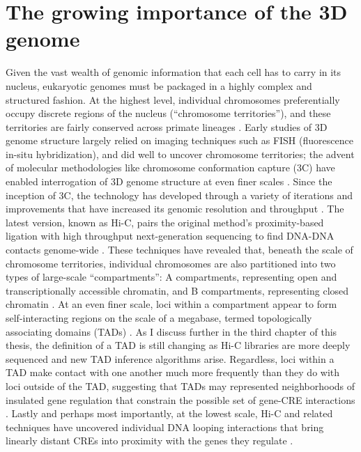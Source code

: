 \section{The growing importance of the 3D genome}
Given the vast wealth of genomic information that each cell has to carry in its nucleus, eukaryotic genomes must be packaged in a highly complex and structured fashion. At the highest level, individual chromosomes preferentially occupy discrete regions of the nucleus (``chromosome territories''), and these territories are fairly conserved across primate lineages \cite{Meaburn.2007, Mora.2006, Tanabe.2002}. Early studies of 3D genome structure largely relied on imaging techniques such as FISH (fluorescence in-situ hybridization), and did well to uncover chromosome territories; the advent of molecular methodologies like chromosome conformation capture (3C) have enabled interrogation of 3D genome structure at even finer scales \cite{Dekker.2002}. Since the inception of 3C, the technology has developed through a variety of iterations and improvements that have increased its genomic resolution and throughput \cite{Fraser.2015}. The latest version, known as Hi-C, pairs the original method's proximity-based ligation with high throughput next-generation sequencing to find DNA-DNA contacts genome-wide \cite{Lieberman-Aiden.2009}. These techniques have revealed that, beneath the scale of chromosome territories, individual chromosomes are also partitioned into two types of large-scale ``compartments'': A compartments, representing open and transcriptionally accessible chromatin, and B compartments, representing closed chromatin \cite{Lieberman-Aiden.2009, Naumova.2010}. At an even finer scale, loci within a compartment appear to form self-interacting regions on the scale of a megabase, termed topologically associating domains (TADs) \cite{Dixon.2012, Nora.2012, Hou.2012, Sexton.2012}. As I discuss further in the third chapter of this thesis, the definition of a TAD is still changing as Hi-C libraries are more deeply sequenced and new TAD inference algorithms arise. Regardless, loci within a TAD make contact with one another much more frequently than they do with loci outside of the TAD, suggesting that TADs may represented neighborhoods of insulated gene regulation that constrain the possible set of gene-CRE interactions \cite{Andrey.2017, Symmons.2014, Sexton.2015}. Lastly and perhaps most importantly, at the lowest scale, Hi-C and related techniques have uncovered individual DNA looping interactions that bring linearly distant CREs into proximity with the genes they regulate \cite{Rao.2014, Kadauke.2009}.

